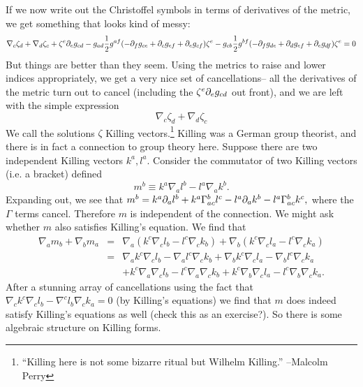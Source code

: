 If we now write out the Christoffel symbols in terms of derivatives of the metric, we get something that looks kind of messy:
$$\nabla_c \zeta_d +\nabla_d \zeta_c +\zeta^e \partial_e g_{cd} -g_{ad} \frac{1}{2} g^{af}(-\partial_f g_{ce}+\partial_c g_{ef} +\partial_e g_{cf})\zeta^e - g_{cb}\frac{1}{2} g^{bf}(-\partial_f g_{de}+\partial_d g_{ef}+\partial_e g_{df})\zeta^e=0$$
But things are better than they seem. Using the metrics to raise and lower indices appropriately, we get a very nice set of cancellations-- all the derivatives of the metric turn out to cancel (including the $\zeta^e \partial_e g_{cd}$ out front), and we are left with the simple expression
$$\nabla_c \zeta_d +\nabla_d \zeta_c$$
We call the solutions $\zeta$ Killing vectors.\footnote{``Killing here is not some bizarre ritual but Wilhelm Killing.'' --Malcolm Perry} Killing was a German group theorist, and there is in fact a connection to group theory here. Suppose there are two independent Killing vectors $k^a,l^a$. Consider the commutator of two Killing vectors (i.e. a bracket) defined
$$m^b\equiv k^a\nabla_a l^b - l^a \nabla_a k^b.$$
Expanding out, we see that
$m^b=k^a\partial_a l^b+ k^a\Gamma^b_{ac} l^c - l^a \partial_a k^b - l^a \Gamma^b_{ac} k^c,$
where the $\Gamma$ terms cancel. Therefore $m$ is independent of the connection. We might ask whether $m$ also satisfies Killing's equation. We find that
\begin{eqnarray*}
\nabla_a m_b +\nabla_b m_a &=& \nabla_a (k^c \nabla_c l_b - l^c \nabla_c k_b)+\nabla_b (k^c \nabla_c l_a -l^c \nabla_c k_a)\\
&=& \nabla_a k^c \nabla_c l_b -\nabla_a l^c \nabla_c k_b + \nabla_b k^c \nabla_c l_a -\nabla_b l^c \nabla_c k_a\\
&&+k^c \nabla_a \nabla_c l_b - l^c \nabla_a \nabla_c k_b +k^c \nabla_b \nabla_c l_a - l^c \nabla_b \nabla_c k_a.
\end{eqnarray*}
After a stunning array of cancellations using the fact that $\nabla_c k^c \nabla_c l_b - \nabla^c l_b \nabla_c k_a=0$ (by Killing's equations) we find that $m$ does indeed satisfy Killing's equations as well (check this as an exercise?). So there is some algebraic structure on Killing forms.
